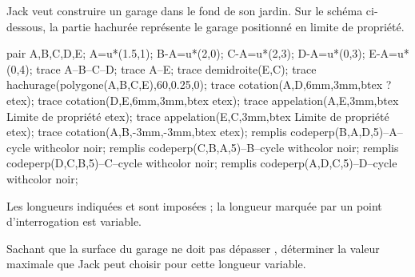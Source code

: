 \begin{exercice*}
    Jack veut construire un garage dans le fond de son jardin. Sur le schéma ci-dessous, la partie hachurée représente le garage positionné en limite de propriété.
    \begin{center}
        \begin{Geometrie}[CoinHD={(5u,5.5u)}]
            pair A,B,C,D,E;
            A=u*(1.5,1);
            B-A=u*(2,0);
            C-A=u*(2,3);
            D-A=u*(0,3);
            E-A=u*(0,4);
            trace A--B--C--D;
            trace A--E;
            trace demidroite(E,C);
            trace hachurage(polygone(A,B,C,E),60,0.25,0);
            trace cotation(A,D,6mm,3mm,btex ? etex);
            trace cotation(D,E,6mm,3mm,btex  etex);
            trace appelation(A,E,3mm,btex Limite de propriété etex);
            trace appelation(E,C,3mm,btex \hspace*{20mm}Limite de propriété etex);
            trace cotation(A,B,-3mm,-3mm,btex  etex);
            remplis codeperp(B,A,D,5)--A--cycle withcolor noir;
            remplis codeperp(C,B,A,5)--B--cycle withcolor noir;
            remplis codeperp(D,C,B,5)--C--cycle withcolor noir;
            remplis codeperp(A,D,C,5)--D--cycle withcolor noir;
        \end{Geometrie}
    \end{center}
    Les longueurs indiquées  et  sont imposées ; la longueur marquée par un point d’interrogation est variable.

    Sachant que la surface du garage ne doit pas dépasser , déterminer la valeur maximale que Jack peut choisir pour cette longueur variable.
\end{exercice*}
